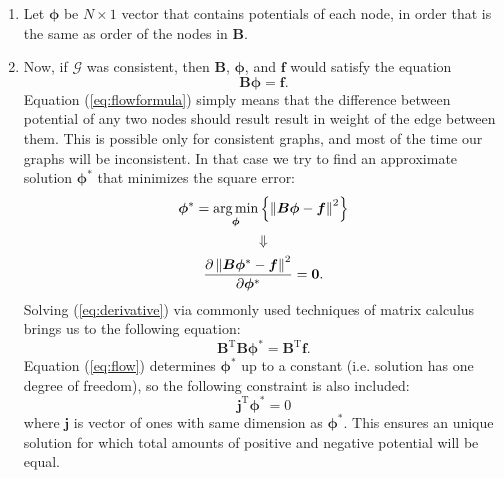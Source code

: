 \documentclass[letterpaper, 10 pt, conference]{ieeeconf}
\newcommand{\matr}[1]{\mathbold{#1}}
\newcommand{\graph}[1]{\mathcal{#1}}
\newcommand{\T}{\mathrm{T}}
\DeclareMathOperator*{\argmin}{arg\min}
\begin{document}
\begin{enumerate}
    \item Let $\matr{\phi}$ be $N \times 1$ vector that contains potentials of each node, in order that is the same as order of the nodes in $\matr{B}$.
    
    \item Now, if $\graph{G}$ was consistent, then $\matr{B}$, $\matr{\phi}$, and $\matr{f}$ would satisfy the equation
    \begin{equation}
    \label{eq:flowformula}
    \matr{B} \matr{\phi} = \matr{f}.
    \end{equation}
    Equation (\ref{eq:flowformula}) simply means that the difference between potential of any two nodes should result result in weight of the edge between them.
    This is possible only for consistent graphs, and most of the time our graphs will be inconsistent.
    In that case we try to find an approximate solution $\matr{\phi^*}$ that minimizes the square error:
    \begin{gather}
    \matr{\phi^*} = \argmin_{\matr{\phi}} \left\{ \left \lVert \matr{B} \matr{\phi} - \matr{f}\textsl{} \right \rVert ^ 2 \right\} \nonumber \\ 
    \Downarrow \nonumber \\
    \label{eq:derivative}
    \frac{\partial \left \lVert \matr{B} \matr{\phi^*} - \matr{f} \right \rVert ^ 2}{\partial \matr{\phi^*}} = \mathbf{0}.
    \end{gather}
    Solving (\ref{eq:derivative}) via commonly used techniques of matrix calculus brings us to the following equation:
    \begin{equation}
    \label{eq:flow}
    \matr{B}^\T \matr{B} \matr{\phi^*} = \matr{B}^\T \matr{f}.
    \end{equation}
    Equation (\ref{eq:flow}) determines $\matr{\phi^*}$ up to a constant (i.e. solution has one degree of freedom), so the following constraint is also included:
    \begin{equation}
    \label{eq:sumiszero}
    \matr{j}^\T \matr{\phi^*} = 0
    \end{equation}
    where $\matr{j}$ is vector of ones with same dimension as $\matr{\phi^*}$.
    This ensures an unique solution for which total amounts of positive and negative potential will be equal.
    

\end{enumerate}
\end{document}
